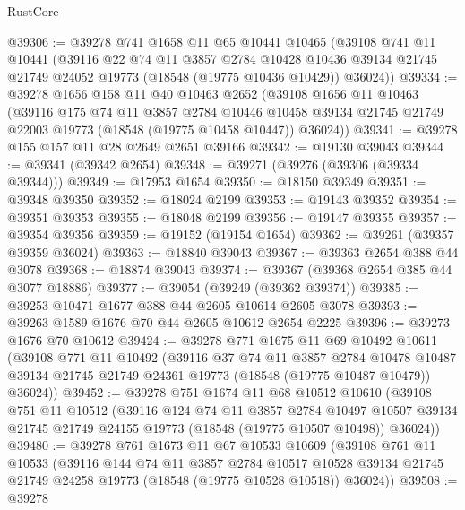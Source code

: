 \begin{lexlean}{RustCore}
\begin{coremodule}
@39306 := @39278
    @741
    @1658
    @11
    @65
    @10441
    @10465
    (@39108
      @741
      @11
      @10441
      (@39116
        @22
        @74
        @11
        @3857
        @2784
        @10428
        @10436
        @39134
        @21745
        @21749
        @24052
        @19773
        (@18548 (@19775 @10436 @10429))
        @36024))
@39334 := @39278
    @1656
    @158
    @11
    @40
    @10463
    @2652
    (@39108
      @1656
      @11
      @10463
      (@39116
        @175
        @74
        @11
        @3857
        @2784
        @10446
        @10458
        @39134
        @21745
        @21749
        @22003
        @19773
        (@18548 (@19775 @10458 @10447))
        @36024))
@39341 := @39278 @155 @157 @11 @28 @2649 @2651 @39166
@39342 := @19130 @39043
@39344 := @39341 (@39342 @2654)
@39348 := @39271 (@39276 (@39306 (@39334 @39344)))
@39349 := @17953 @1654
@39350 := @18150 @39349
@39351 := @39348 @39350
@39352 := @18024 @2199
@39353 := @19143 @39352
@39354 := @39351 @39353
@39355 := @18048 @2199
@39356 := @19147 @39355
@39357 := @39354 @39356
@39359 := @19152 (@19154 @1654)
@39362 := @39261 (@39357 @39359 @36024)
@39363 := @18840 @39043
@39367 := @39363 @2654 @388 @44 @3078
@39368 := @18874 @39043
@39374 := @39367 (@39368 @2654 @385 @44 @3077 @18886)
@39377 := @39054 (@39249 (@39362 @39374))
@39385 := @39253 @10471 @1677 @388 @44 @2605 @10614 @2605 @3078
@39393 := @39263 @1589 @1676 @70 @44 @2605 @10612 @2654 @2225
@39396 := @39273 @1676 @70 @10612
@39424 := @39278
    @771
    @1675
    @11
    @69
    @10492
    @10611
    (@39108
      @771
      @11
      @10492
      (@39116
        @37
        @74
        @11
        @3857
        @2784
        @10478
        @10487
        @39134
        @21745
        @21749
        @24361
        @19773
        (@18548 (@19775 @10487 @10479))
        @36024))
@39452 := @39278
    @751
    @1674
    @11
    @68
    @10512
    @10610
    (@39108
      @751
      @11
      @10512
      (@39116
        @124
        @74
        @11
        @3857
        @2784
        @10497
        @10507
        @39134
        @21745
        @21749
        @24155
        @19773
        (@18548 (@19775 @10507 @10498))
        @36024))
@39480 := @39278
    @761
    @1673
    @11
    @67
    @10533
    @10609
    (@39108
      @761
      @11
      @10533
      (@39116
        @144
        @74
        @11
        @3857
        @2784
        @10517
        @10528
        @39134
        @21745
        @21749
        @24258
        @19773
        (@18548 (@19775 @10528 @10518))
        @36024))
@39508 := @39278

\end{coremodule}
\end{lexlean}
